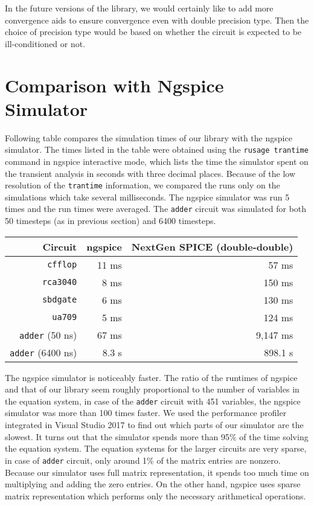 In the future versions of the library, we would certainly like to add more convergence aids to ensure convergence even with double precision type. Then the choice of precision type would be based on whether the circuit is expected to be ill-conditioned or not.

\section{Comparison with Ngspice Simulator} 

Following table compares the simulation times of our library with the ngspice simulator. The times listed in the table were obtained using the \texttt{rusage trantime} command in ngspice interactive mode, which lists the time the simulator spent on the transient analysis in seconds with three decimal places. Because of the low resolution of the \texttt{trantime} information, we compared the runs only on the simulations which take several milliseconds. The ngspice simulator was run 5 times and the run times were averaged. The \texttt{adder} circuit was simulated for both 50 timesteps (as in previous section) and 6400 timesteps.

\begin{center}
	\begin{tabular}{|r|r|r|}
		\hline
		Circuit & ngspice & NextGen SPICE (double-double) \\ \hline \hline
		\texttt{cfflop} & 11 ms & 57 ms \\
		\texttt{rca3040} & 8 ms & 150 ms \\
		\texttt{sbdgate} & 6 ms & 130 ms \\
		\texttt{ua709} & 5 ms & 124 ms \\
		\texttt{adder} (50 ns) & 67 ms & 9,147 ms  \\
		\texttt{adder} (6400 ns) & 8.3 s & 898.1 s \\
		\hline
	\end{tabular}
\end{center}

The ngspice simulator is noticeably faster. The ratio of the runtimes of ngspice and that of our library seem roughly proportional to the number of variables in the equation system, in case of the \texttt{adder} circuit with 451 variables, the ngspice simulator was more than 100 times faster. We used the performance profiler integrated in Visual Studio 2017 to find out which parts of our simulator are the slowest. It turns out that the simulator spends more than 95\% of the time solving the equation system. The equation systems for the larger circuits are very sparse, in case of \texttt{adder} circuit, only around 1\% of the matrix entries are nonzero. Because our simulator uses full matrix representation, it spends too much time on multiplying and adding the zero entries. On the other hand, ngspice uses sparse matrix representation which performs only the necessary arithmetical operations.

